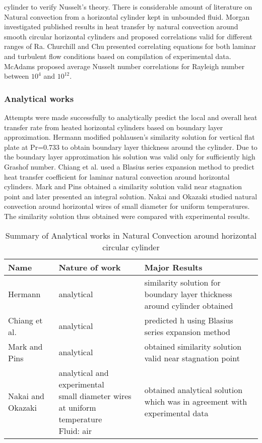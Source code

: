  cylinder to verify Nusselt's theory. There is considerable amount of literature on Natural convection from a horizontal cylinder kept in unbounded fluid. Morgan\cite{mor} investigated published results in heat transfer by natural convection around smooth  circular horizontal cylinders and proposed correlations valid for different ranges of Ra.  Churchill and Chu\cite{chu} presented correlating equations for both laminar and turbulent flow conditions based on compilation of experimental data. McAdams\cite{mca} proposed average Nusselt number correlations for Rayleigh number between $10^4$ and $10^{12}$.   

\subsubsection{Analytical works}
Attempts were made successfully to analytically predict the local and overall heat transfer rate from heated horizontal cylinders based on boundary layer approximation. Hermann\cite{her} modified pohlausen's  similarity solution for vertical flat plate at Pr=0.733 to obtain boundary layer thickness around the cylinder. Due to the boundary layer approximation his solution was valid only for sufficiently high Grashof number. Chiang et al.\cite{chg} used a Blasius series expansion method to predict heat transfer coefficient for laminar natural convection around horizontal cylinders. Mark and Pins\cite{mark} obtained a similarity solution valid near stagnation point and later presented an integral solution. Nakai and Okazaki\cite{nki} studied natural convection around horizontal wires of small diameter for uniform temperatures. The similarity solution thus obtained were compared with experimental results.\\
\begin{table}[h]
\caption{Summary of Analytical works in Natural Convection around horizontal circular cylinder}
\label{tab:analytical}
\begin{center}
\begin{tabular}{|p{3cm}|p{7cm}|p{5cm}|}
\hline
Name & Nature of work & Major Results\\
\hline
Hermann & analytical & similarity solution for boundary layer thickness around cylinder obtained \\
\hline
Chiang et al. & analytical & predicted h using Blasius series expansion method \\
\hline
Mark and Pins & analytical & obtained similarity solution valid near stagnation point \\
\hline
Nakai and Okazaki & \pbox{5cm}{analytical and experimental \\small diameter wires at  uniform temperature \\Fluid: air } & obtained analytical solution which was in agreement with experimental data\\
\hline
\end{tabular}
\end{center}
\end{table}                  
 
